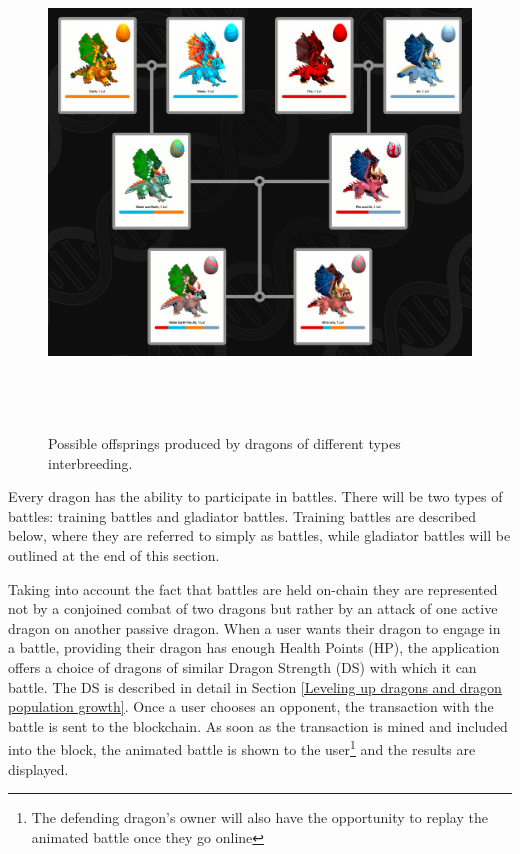 \documentclass[12pt]{article}
\begin{document}
\begin{Center}
\begin{figure}[!ht]
	\begin{Center}		\includegraphics[width=6.27in,height=5.15in]{./media/image16.png}
		\caption{Possible offsprings produced by dragons of different types interbreeding.}
		\label{fig:Possible_offsprings_produced_by_dragons_of_different_types_interbreeding}
	\end{Center}\end{figure}
\end{Center}





Every dragon has the ability to participate in battles. There will be two types of battles: training battles and gladiator battles. Training battles are described below, where they are referred to simply as battles, while gladiator battles will be outlined at the end of this section.\par

Taking into account the fact that battles are held on-chain they are represented not by a conjoined combat of two dragons but rather by an attack of one active dragon on another passive dragon. When a user wants their dragon to engage in a battle, providing their dragon has enough Health Points (HP), the application offers a choice of dragons of similar Dragon Strength (DS) with which it can battle. The DS is described in detail in Section \ref{Leveling up dragons and dragon population growth}. Once a user chooses an opponent, the transaction with the battle is sent to the blockchain. As soon as the transaction is mined and included into the block, the animated battle is shown to the user\footnote{The defending dragon’s owner will also have the opportunity to replay the animated battle once they go online} and the results are displayed.\par
\end{document}
